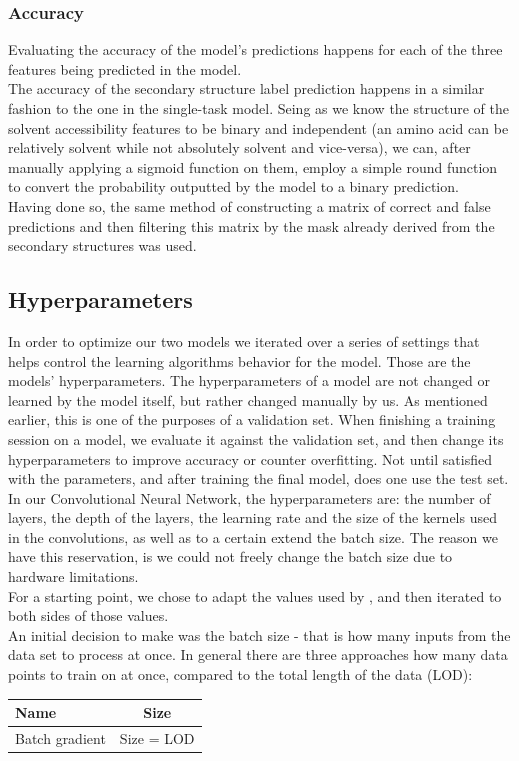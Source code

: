 \begin{multicols}{2}
\subsubsection{Accuracy}
Evaluating the accuracy of the model's predictions happens for each of the three features being predicted in the model.\\
The accuracy of the secondary structure label prediction happens in a similar fashion to the one in the single-task model. Seing as we know the structure of the solvent accessibility features to be binary and independent (an amino acid can be relatively solvent while not absolutely solvent and vice-versa), we can, after manually applying a sigmoid function on them, employ a simple round function to convert the probability outputted by the model to a binary prediction.\\
Having done so, the same method of constructing a matrix of correct and false predictions and then filtering this matrix by the mask already derived from the secondary structures was used.


\subsection{Hyperparameters}
In order to optimize our two models we iterated over a series of settings that helps control the learning algorithms behavior for the model. Those are the models' hyperparameters.
The hyperparameters of a model are not changed or learned by the model itself, but rather changed manually by us. As mentioned earlier, this is one of the purposes of a validation set. 
When finishing a training session on a model, we evaluate it against the validation set, and then change its hyperparameters to improve accuracy or counter overfitting. Not until satisfied with the parameters, and after training the final model, does one use the test set. \citep{goodfellow-et-al-2016} In our Convolutional Neural Network, the hyperparameters are: the number of layers, the depth of the layers, the learning rate and the size of the kernels used in the convolutions, as well as to a certain extend the batch size. The reason we have this reservation, is we could not freely change the batch size due to hardware limitations.\\
For a starting point, we chose to adapt the values used by \citeauthor{wang-et-al-2016}, and then iterated to both sides of those values.\\
An initial decision to make was the batch size - that is how many inputs from the data set to process at once. In general there are three approaches how many data points to train on at once, compared to the total length of the data (LOD):
\begin{center}
\begin{tabular}{l|c}
\hline 
Name & Size \\ 
\hline 
Batch gradient & Size = LOD \\ 


\end{tabular}
\end{center}
\end{multicols}
